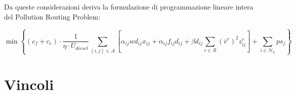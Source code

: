 	Da queste considerazioni deriva la formulazione di programmazione lineare intera del Pollution Routing Problem:

	\begin{equation}
		\label{eq:objective}
		\min\left\{
		(c_f + c_e) \cdot 
		\frac{1}{\eta \cdot U_{diesel}} 
		\sum_{(i,j) \in \mathcal{A}} \left[
			\alpha_{ij}wd_{ij}x_{ij} + 
			\alpha_{ij}f_{ij}d_{ij} + 
			\beta d_{ij} \sum_{r \in \mathcal{R}} (\overline v^r)^2 z_{ij}^r
		\right] + 
		\sum_{i \in \mathcal{N}_0} p s_j
		\right\}
	\end{equation}


	\section{Vincoli} %
	\label{sec:vincoli}

